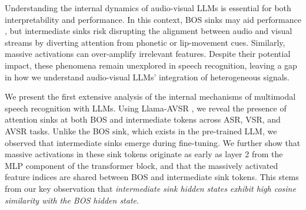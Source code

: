\documentclass{article}
\begin{document}
Understanding the internal dynamics of audio-visual LLMs is essential for both interpretability and performance. In this context, BOS sinks may aid performance \cite{xiao2023streamingllm, gu2024attention}, but intermediate sinks risk disrupting the alignment between audio and visual streams by diverting attention from phonetic or lip-movement cues. Similarly, massive activations can over-amplify irrelevant features. Despite their potential impact, these phenomena remain unexplored in speech recognition, leaving a gap in how we understand audio-visual LLMs’ integration of heterogeneous signals.



We present the first extensive analysis of the internal mechanisms of multimodal speech recognition with LLMs. Using Llama-AVSR \cite{cappellazzo2025large}, we reveal the presence of attention sinks at both BOS and intermediate tokens across ASR, VSR, and AVSR tasks. Unlike the BOS sink, which exists in the pre-trained LLM, we observed that intermediate sinks emerge during fine-tuning. We further show that massive activations in these sink tokens originate as early as layer 2 from the MLP component of the transformer block, and that the massively activated feature indices are shared between BOS and intermediate sink tokens. This stems from our key observation that \textit{intermediate sink hidden states exhibit high cosine similarity with the BOS hidden state}.
\end{document}
